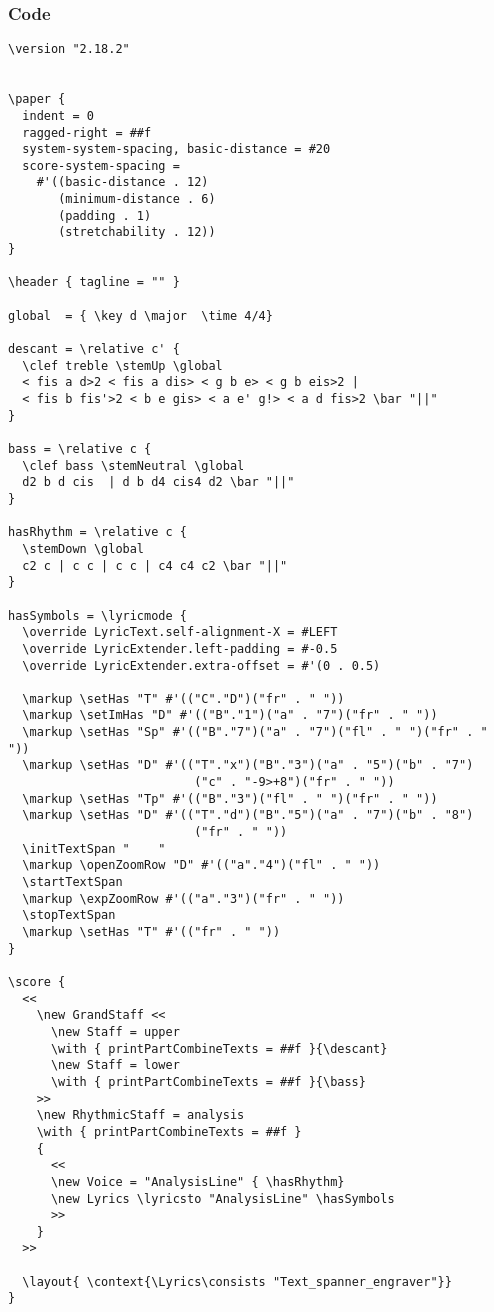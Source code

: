 \documentclass[
  DIV=calc,
  BCOR=5mm,
  12pt,
  headings=small,
  oneside,
  abstract=true,
  toc=bib,
  xcolor=dvipsnames,
  openany,
  english]{scrartcl}
\begin{document}
\subsubsection{Code}
\begin{scriptsize}
\begin{verbatim}
\version "2.18.2"


\paper {
  indent = 0
  ragged-right = ##f
  system-system-spacing, basic-distance = #20
  score-system-spacing =
    #'((basic-distance . 12)
       (minimum-distance . 6)
       (padding . 1)
       (stretchability . 12))
}

\header { tagline = "" }

global  = { \key d \major  \time 4/4}

descant = \relative c' {
  \clef treble \stemUp \global
  < fis a d>2 < fis a dis> < g b e> < g b eis>2 |
  < fis b fis'>2 < b e gis> < a e' g!> < a d fis>2 \bar "||"
}

bass = \relative c {
  \clef bass \stemNeutral \global
  d2 b d cis  | d b d4 cis4 d2 \bar "||"
}

hasRhythm = \relative c {
  \stemDown \global
  c2 c | c c | c c | c4 c4 c2 \bar "||"
}

hasSymbols = \lyricmode {
  \override LyricText.self-alignment-X = #LEFT
  \override LyricExtender.left-padding = #-0.5
  \override LyricExtender.extra-offset = #'(0 . 0.5)

  \markup \setHas "T" #'(("C"."D")("fr" . " "))
  \markup \setImHas "D" #'(("B"."1")("a" . "7")("fr" . " "))
  \markup \setHas "Sp" #'(("B"."7")("a" . "7")("fl" . " ")("fr" . " "))
  \markup \setHas "D" #'(("T"."x")("B"."3")("a" . "5")("b" . "7")
                          ("c" . "-9>+8")("fr" . " "))
  \markup \setHas "Tp" #'(("B"."3")("fl" . " ")("fr" . " "))
  \markup \setHas "D" #'(("T"."d")("B"."5")("a" . "7")("b" . "8")
                          ("fr" . " "))
  \initTextSpan "    "
  \markup \openZoomRow "D" #'(("a"."4")("fl" . " "))
  \startTextSpan
  \markup \expZoomRow #'(("a"."3")("fr" . " "))
  \stopTextSpan
  \markup \setHas "T" #'(("fr" . " "))
}

\score {
  <<
    \new GrandStaff <<
      \new Staff = upper
      \with { printPartCombineTexts = ##f }{\descant}
      \new Staff = lower
      \with { printPartCombineTexts = ##f }{\bass}
    >>
    \new RhythmicStaff = analysis
    \with { printPartCombineTexts = ##f }
    {
      <<
      \new Voice = "AnalysisLine" { \hasRhythm}
      \new Lyrics \lyricsto "AnalysisLine" \hasSymbols
      >>
    }
  >>

  \layout{ \context{\Lyrics\consists "Text_spanner_engraver"}}
}

\end{verbatim}
\end{scriptsize}
\end{document}
